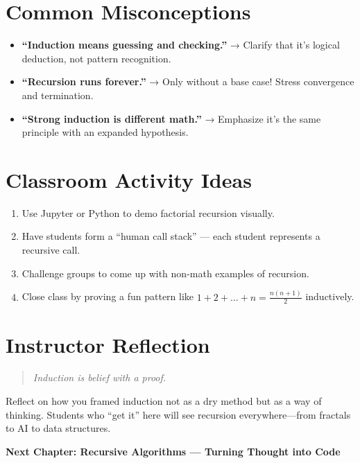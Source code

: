 \section{Common Misconceptions}
\begin{itemize}
  \item \textbf{“Induction means guessing and checking.”}  
        → Clarify that it’s logical deduction, not pattern recognition.
  \item \textbf{“Recursion runs forever.”}  
        → Only without a base case! Stress convergence and termination.
  \item \textbf{“Strong induction is different math.”}  
        → Emphasize it’s the same principle with an expanded hypothesis.
\end{itemize}

\section{Classroom Activity Ideas}
\begin{enumerate}
  \item Use Jupyter or Python to demo factorial recursion visually.
  \item Have students form a “human call stack” — each student represents a recursive call.
  \item Challenge groups to come up with non-math examples of recursion.
  \item Close class by proving a fun pattern like $1 + 2 + \dots + n = \frac{n(n+1)}{2}$ inductively.
\end{enumerate}

\section{Instructor Reflection}
\begin{quote}
\textit{Induction is belief with a proof.}
\end{quote}
Reflect on how you framed induction not as a dry method but as a way of thinking.
Students who “get it” here will see recursion everywhere—from fractals to AI to data structures.

\begin{center}
\textbf{Next Chapter: Recursive Algorithms — Turning Thought into Code}
\end{center}

